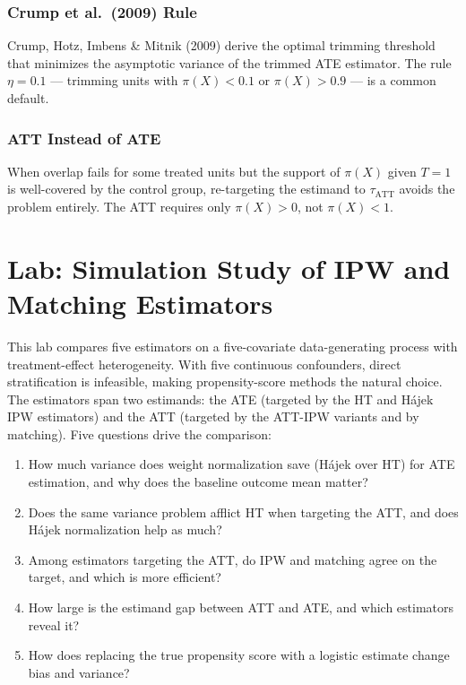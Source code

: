 \documentclass[master.tex]{subfiles}
\begin{document}
\subsubsection*{Crump et al.\ (2009) Rule}
Crump, Hotz, Imbens \& Mitnik (2009) derive the optimal trimming
threshold that minimizes the asymptotic variance of the trimmed ATE
estimator.  The rule $\eta = 0.1$ --- trimming units with $\pi(X) < 0.1$
or $\pi(X) > 0.9$ --- is a common default.

\subsubsection*{ATT Instead of ATE}
When overlap fails for some treated units but the support of $\pi(X)$
given $T{=}1$ is well-covered by the control group, re-targeting the
estimand to $\tau_{\mathrm{ATT}}$ avoids the problem entirely.  The ATT
requires only $\pi(X) > 0$, not $\pi(X) < 1$.




\section{Lab: Simulation Study of IPW and Matching Estimators}
\label{w6:sec:lab}

This lab compares five estimators on a five-covariate data-generating
process with treatment-effect heterogeneity.  With five continuous
confounders, direct stratification is infeasible, making
propensity-score methods the natural choice.  The estimators span two
estimands: the ATE (targeted by the HT and Hájek IPW estimators) and
the ATT (targeted by the ATT-IPW variants and by matching).  Five
questions drive the comparison:
\begin{enumerate}
  \item How much variance does weight normalization save (Hájek over HT)
    for ATE estimation, and why does the baseline outcome mean matter?
  \item Does the same variance problem afflict HT when targeting the ATT,
    and does Hájek normalization help as much?
  \item Among estimators targeting the ATT, do IPW and matching agree
    on the target, and which is more efficient?
  \item How large is the estimand gap between ATT and ATE, and which
    estimators reveal it?
  \item How does replacing the true propensity score with a logistic
    estimate change bias and variance?
\end{enumerate}
\end{document}
